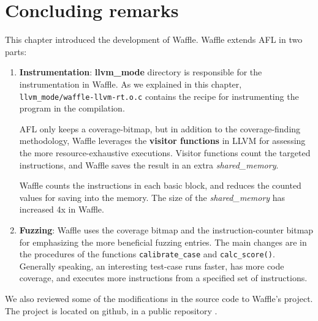 \newpage
\section{Concluding remarks}

This chapter introduced the development of Waffle. Waffle extends AFL in two parts:

\begin{enumerate}
    \item \textbf{Instrumentation}: \textbf{llvm\_mode} directory is responsible for the instrumentation in Waffle. As we explained in this chapter, \texttt{llvm\_mode/waffle-llvm-rt.o.c} contains the recipe for instrumenting the program in the compilation.
    
    AFL only keeps a coverage-bitmap, but in addition to the coverage-finding methodology, Waffle leverages the \textbf{visitor functions} in LLVM for assessing the more resource-exhaustive executions. Visitor functions count the targeted instructions, and Waffle saves the result in an extra \textit{shared\_memory}.

    Waffle counts the instructions in each basic block, and reduces the counted values for saving into the memory. The size of the \textit{shared\_memory} has increased 4x in Waffle.

    \item \textbf{Fuzzing}: Waffle uses the coverage bitmap and the instruction-counter bitmap for emphasizing the more beneficial fuzzing entries. The main changes are in the procedures of the functions \texttt{calibrate\_case} and \texttt{calc\_score()}. Generally speaking, an interesting test-case runs faster, has more code coverage, and executes more instructions from a specified set of instructions.
\end{enumerate}

We also reviewed some of the modifications in the source code to Waffle's project. The project is located on github, in a public repository \cite{wafl_git}.